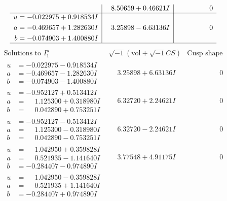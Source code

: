 \documentclass[1p]{elsarticle_modified}
\theoremstyle{definition}
\newcommand{\I}{\sqrt{-1}}
\begin{document}
$$\begin{array}{c|c|c}
 & \phantom{-}8.50659 + 0.46621 I & \phantom{-0.000000 } 0 \\ \hline\begin{aligned}
u &= -0.022975 + 0.918534 I \\
a &= -0.469657 + 1.282630 I \\
b &= -0.074903 + 1.400880 I\end{aligned}
 & \phantom{-}3.25898 - 6.63136 I & \phantom{-0.000000 } 0\\
 \hline 
 \end{array}$$\newpage$$\begin{array}{c|c|c}  
\text{Solutions to }I^u_{1}& \I (\text{vol} + \sqrt{-1}CS) & \text{Cusp shape}\\
 \hline 
\begin{aligned}
u &= -0.022975 - 0.918534 I \\
a &= -0.469657 - 1.282630 I \\
b &= -0.074903 - 1.400880 I\end{aligned}
 & \phantom{-}3.25898 + 6.63136 I & \phantom{-0.000000 } 0 \\ \hline\begin{aligned}
u &= -0.952127 + 0.513412 I \\
a &= \phantom{-}1.125300 + 0.318980 I \\
b &= \phantom{-}0.042890 + 0.753251 I\end{aligned}
 & \phantom{-}6.32720 + 2.24621 I & \phantom{-0.000000 } 0 \\ \hline\begin{aligned}
u &= -0.952127 - 0.513412 I \\
a &= \phantom{-}1.125300 - 0.318980 I \\
b &= \phantom{-}0.042890 - 0.753251 I\end{aligned}
 & \phantom{-}6.32720 - 2.24621 I & \phantom{-0.000000 } 0 \\ \hline\begin{aligned}
u &= \phantom{-}1.042950 + 0.359828 I \\
a &= \phantom{-}0.521935 - 1.141640 I \\
b &= -0.284407 - 0.974890 I\end{aligned}
 & \phantom{-}3.77548 + 4.91175 I & \phantom{-0.000000 } 0 \\ \hline\begin{aligned}
u &= \phantom{-}1.042950 - 0.359828 I \\
a &= \phantom{-}0.521935 + 1.141640 I \\
b &= -0.284407 + 0.974890 I\end{aligned}

\end{array}$$
\end{document}
